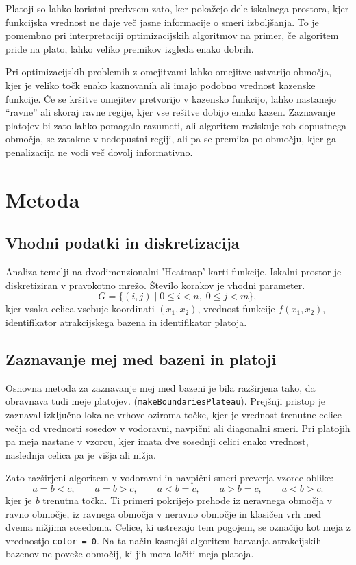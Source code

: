 \documentclass[12pt,a4paper]{article}
\begin{document}
Platoji so lahko koristni predvsem zato, ker pokažejo dele iskalnega prostora, kjer funkcijska vrednost ne daje več jasne informacije o smeri izboljšanja. To je pomembno pri interpretaciji optimizacijskih algoritmov na primer, če algoritem pride na plato, lahko veliko premikov izgleda enako dobrih.

Pri optimizacijskih problemih z omejitvami lahko omejitve ustvarijo območja, kjer je veliko točk enako kaznovanih ali imajo podobno vrednost kazenske funkcije. Če se kršitve omejitev pretvorijo v kazensko funkcijo, lahko nastanejo “ravne” ali skoraj ravne regije, kjer vse rešitve dobijo enako kazen. Zaznavanje platojev bi zato lahko pomagalo razumeti, ali algoritem raziskuje rob dopustnega območja, se zatakne v nedopustni regiji, ali pa se premika po območju, kjer ga penalizacija ne vodi več dovolj informativno.

\section{Metoda}

\subsection{Vhodni podatki in diskretizacija}

Analiza temelji na dvodimenzionalni 'Heatmap' karti funkcije. Iskalni prostor je diskretiziran v pravokotno mrežo. Število korakov je vhodni parameter. 
\[
G = \{(i,j) \mid 0 \le i < n,\; 0 \le j < m\},
\]
kjer vsaka celica vsebuje koordinati \((x_1,x_2)\), vrednost funkcije \(f(x_1,x_2)\), identifikator atrakcijskega bazena in identifikator platoja. 

\subsection{Zaznavanje mej med bazeni in platoji}

Osnovna metoda za zaznavanje mej med bazeni je bila razširjena tako, da obravnava tudi meje platojev. (\texttt{makeBoundariesPlateau}). Prejšnji pristop je zaznaval izključno lokalne vrhove oziroma točke, kjer je vrednost trenutne celice večja od vrednosti sosedov v vodoravni, navpični ali diagonalni smeri. Pri platojih pa meja nastane v vzorcu, kjer imata dve sosednji celici enako vrednost, naslednja celica pa je višja ali nižja.

Zato razširjeni algoritem v vodoravni in navpični smeri preverja vzorce oblike:
\[
a = b < c,\qquad a = b > c,\qquad a < b = c,\qquad a > b = c,\qquad a < b > c.
\]
kjer je \textit{b} trenutna točka.
Ti primeri pokrijejo prehode iz neravnega območja v ravno območje, iz ravnega območja v neravno območje in klasičen vrh med dvema nižjima sosedoma. Celice, ki ustrezajo tem pogojem, se označijo kot meja z vrednostjo \texttt{color = 0}. Na ta način kasnejši algoritem barvanja atrakcijskih bazenov ne poveže območij, ki jih mora ločiti meja platoja.
\end{document}
